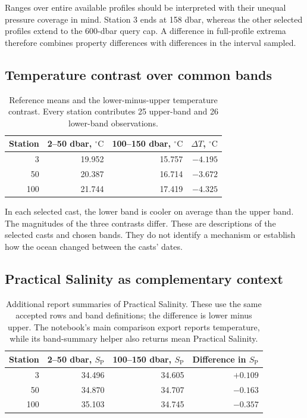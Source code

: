 \documentclass[11pt,letterpaper]{article}
\newcommand{\degC}{\ensuremath{{}^{\circ}\mathrm{C}}}
\newcommand{\SP}{\ensuremath{S_{\mathrm{P}}}}
\begin{document}
Ranges over entire available profiles should be interpreted with their unequal pressure coverage in mind. Station 3 ends at 158 dbar, whereas the other selected profiles extend to the 600-dbar query cap. A difference in full-profile extrema therefore combines property differences with differences in the interval sampled.

\subsection{Temperature contrast over common bands}
\begin{table}[htbp]
\centering
\caption{Reference means and the lower-minus-upper temperature contrast. Every station contributes 25 upper-band and 26 lower-band observations.}
\label{tab:temperature}
\begin{tabular}{rrrr}
\toprule
\textbf{Station} & \textbf{2--50 dbar, \degC} & \textbf{100--150 dbar, \degC} & \textbf{$\Delta T$, \degC} \\
\midrule
3 & 19.952 & 15.757 & $-4.195$ \\
50 & 20.387 & 16.714 & $-3.672$ \\
100 & 21.744 & 17.419 & $-4.325$ \\
\bottomrule
\end{tabular}
\end{table}

In each selected cast, the lower band is cooler on average than the upper band. The magnitudes of the three contrasts differ. These are descriptions of the selected casts and chosen bands. They do not identify a mechanism or establish how the ocean changed between the casts' dates.

\subsection{Practical Salinity as complementary context}
\begin{table}[htbp]
\centering
\caption{Additional report summaries of Practical Salinity. These use the same accepted rows and band definitions; the difference is lower minus upper. The notebook's main comparison export reports temperature, while its band-summary helper also returns mean Practical Salinity.}
\label{tab:salinity}
\begin{tabular}{rrrr}
\toprule
\textbf{Station} & \textbf{2--50 dbar, \SP} & \textbf{100--150 dbar, \SP} & \textbf{Difference in \SP} \\
\midrule
3 & 34.496 & 34.605 & $+0.109$ \\
50 & 34.870 & 34.707 & $-0.163$ \\
100 & 35.103 & 34.745 & $-0.357$ \\
\bottomrule
\end{tabular}
\end{table}
\end{document}
